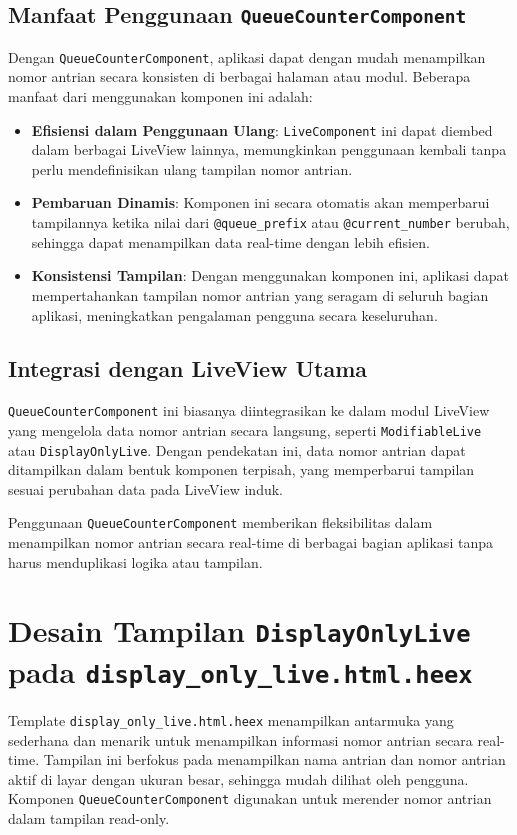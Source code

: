\subsection{Manfaat Penggunaan \texttt{QueueCounterComponent}}
Dengan \texttt{QueueCounterComponent}, aplikasi dapat dengan mudah menampilkan nomor antrian secara konsisten di berbagai halaman atau modul. Beberapa manfaat dari menggunakan komponen ini adalah:
\begin{itemize}
	\item \textbf{Efisiensi dalam Penggunaan Ulang}: \texttt{LiveComponent} ini dapat diembed dalam berbagai LiveView lainnya, memungkinkan penggunaan kembali tanpa perlu mendefinisikan ulang tampilan nomor antrian.
	\item \textbf{Pembaruan Dinamis}: Komponen ini secara otomatis akan memperbarui tampilannya ketika nilai dari \texttt{@queue\_prefix} atau \texttt{@current\_number} berubah, sehingga dapat menampilkan data real-time dengan lebih efisien.
	\item \textbf{Konsistensi Tampilan}: Dengan menggunakan komponen ini, aplikasi dapat mempertahankan tampilan nomor antrian yang seragam di seluruh bagian aplikasi, meningkatkan pengalaman pengguna secara keseluruhan.
\end{itemize}

\subsection{Integrasi dengan LiveView Utama}
\texttt{QueueCounterComponent} ini biasanya diintegrasikan ke dalam modul LiveView yang mengelola data nomor antrian secara langsung, seperti \texttt{ModifiableLive} atau \texttt{DisplayOnlyLive}. Dengan pendekatan ini, data nomor antrian dapat ditampilkan dalam bentuk komponen terpisah, yang memperbarui tampilan sesuai perubahan data pada LiveView induk.

Penggunaan \texttt{QueueCounterComponent} memberikan fleksibilitas dalam menampilkan nomor antrian secara real-time di berbagai bagian aplikasi tanpa harus menduplikasi logika atau tampilan.


\section{Desain Tampilan \texttt{DisplayOnlyLive} pada \texttt{display\_only\_live.html.heex}}

Template \texttt{display\_only\_live.html.heex} menampilkan antarmuka yang sederhana dan menarik untuk menampilkan informasi nomor antrian secara real-time. Tampilan ini berfokus pada menampilkan nama antrian dan nomor antrian aktif di layar dengan ukuran besar, sehingga mudah dilihat oleh pengguna. Komponen \texttt{QueueCounterComponent} digunakan untuk merender nomor antrian dalam tampilan read-only.

